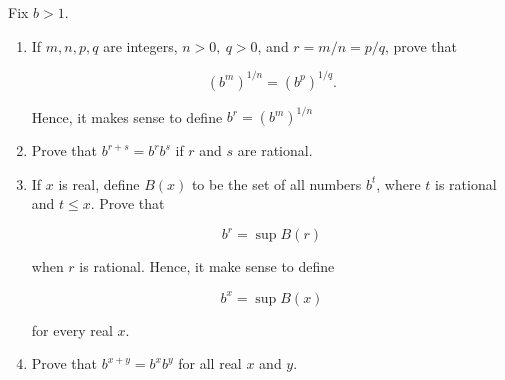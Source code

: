 Fix $b > 1$.

\begin{enumerate}
	\item If $m,n,p,q$ are integers, $n > 0,~q > 0$, and $r = m/n = p/q$, prove that

	$$(b^m)^{1/n} = (b^p)^{1/q}.$$
	
	Hence, it makes sense to define $b^r = (b^m)^{1/n}$
	\item Prove that $b^{r+s} = b^rb^s$ if $r$ and $s$ are rational.
	\item If $x$ is real, define $B(x)$ to be the set of all numbers $b^t$, where $t$ is rational and $t \leq x$. Prove that
	
	$$b^r = \sup B(r)$$
	
	when $r$ is rational. Hence, it make sense to define
	
	$$b^x = \sup B(x)$$
	
	for every real $x$.
	\item Prove that $b^{x+y} = b^xb^y$ for all real $x$ and $y$.
\end{enumerate}

\begin{tcolorbox}
	\begin{solution}
		
	\end{solution}
\end{tcolorbox}